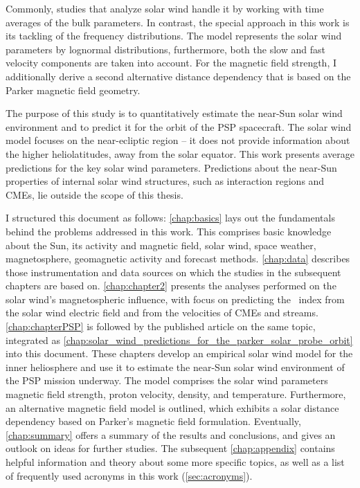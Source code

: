 Commonly, studies that analyze solar wind handle it by working with time averages of the bulk parameters. In contrast, the special approach in this work is its tackling of the frequency distributions. The model represents the solar wind parameters by lognormal distributions, furthermore, both the slow and fast velocity components are taken into account.
For the magnetic field strength, I additionally derive a second alternative distance dependency that is based on the Parker magnetic field geometry.

The purpose of this study is to quantitatively estimate the near-Sun solar wind environment and to predict it for the orbit of the PSP spacecraft.
The solar wind model focuses on the near-ecliptic region -- it does not provide information about the higher heliolatitudes, away from the solar equator.
This work presents average predictions for the key solar wind parameters. Predictions about the near-Sun properties of internal solar wind structures, such as interaction regions and CMEs, lie outside the scope of this thesis.


\bigskip

I structured this document as follows: \autoref{chap:basics} lays out the fundamentals behind the problems addressed in this work. This comprises basic knowledge about the Sun, its activity and magnetic field, solar wind, space weather, magnetosphere, geomagnetic activity and forecast methods. \autoref{chap:data} describes those instrumentation and data sources on which the studies in the subsequent chapters are based on. \autoref{chap:chapter2} presents the analyses performed on the solar wind's magnetospheric influence, with focus on predicting the \Kp~index from the solar wind electric field and from the velocities of CMEs and streams. \autoref{chap:chapterPSP} is followed by the published article on the same topic, integrated as \autoref{chap:solar_wind_predictions_for_the_parker_solar_probe_orbit} into this document. These chapters develop an empirical solar wind model for the inner heliosphere and use it to estimate the near-Sun solar wind environment of the PSP mission underway. The model comprises the solar wind parameters magnetic field strength, proton velocity, density, and temperature. Furthermore, an alternative magnetic field model is outlined, which exhibits a solar distance dependency based on Parker's magnetic field formulation. Eventually, \autoref{chap:summary} offers a summary of the results and conclusions, and gives an outlook on ideas for further studies. The subsequent \autoref{chap:appendix} contains helpful information and theory about some more specific topics, as well as a list of frequently used acronyms in this work (\autoref{sec:acronyms}).


